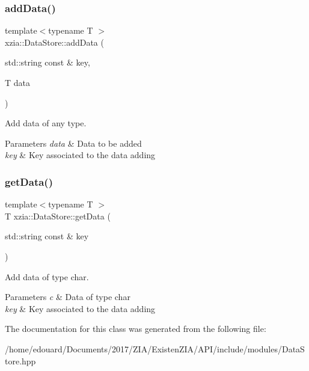 \subsubsection{\texorpdfstring{add\+Data()}{addData()}}
{\footnotesize\ttfamily template$<$typename T $>$ \\
xzia\+::\+Data\+Store\+::add\+Data (\begin{DoxyParamCaption}\item[{std\+::string const \&}]{key,  }\item[{T}]{data }\end{DoxyParamCaption})\hspace{0.3cm}{\ttfamily [inline]}}



Add data of any type. 


\begin{DoxyParams}{Parameters}
{\em data} & Data to be added \\
\hline
{\em key} & Key associated to the data adding \\
\hline
\end{DoxyParams}
\mbox{\label{classxzia_1_1DataStore_a91fb035bfe2bebe2e21a0cf5aaad5a04}} 
\subsubsection{\texorpdfstring{get\+Data()}{getData()}}
{\footnotesize\ttfamily template$<$typename T $>$ \\
T xzia\+::\+Data\+Store\+::get\+Data (\begin{DoxyParamCaption}\item[{std\+::string const \&}]{key }\end{DoxyParamCaption})\hspace{0.3cm}{\ttfamily [inline]}}



Add data of type char. 


\begin{DoxyParams}{Parameters}
{\em c} & Data of type char \\
\hline
{\em key} & Key associated to the data adding \\
\hline
\end{DoxyParams}


The documentation for this class was generated from the following file\+:\begin{DoxyCompactItemize}
\item 
/home/edouard/\+Documents/2017/\+Z\+I\+A/\+Existen\+Z\+I\+A/\+A\+P\+I/include/modules/Data\+Store.\+hpp\end{DoxyCompactItemize}
